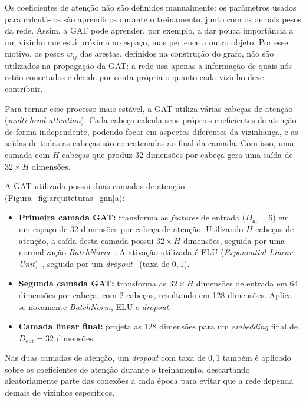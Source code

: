 Os coeficientes de atenção não são definidos manualmente: os parâmetros usados para calculá-los são aprendidos durante o treinamento, junto com os demais pesos da rede. Assim, a GAT pode aprender, por exemplo, a dar pouca importância a um vizinho que está próximo no espaço, mas pertence a outro objeto. Por esse motivo, os pesos $w_{ij}$ das arestas, definidos na construção do grafo, não são utilizados na propagação da GAT: a rede usa apenas a informação de quais nós estão conectados e decide por conta própria o quanto cada vizinho deve contribuir.

Para tornar esse processo mais estável, a GAT utiliza várias cabeças de atenção (\textit{multi-head attention}). Cada cabeça calcula seus próprios coeficientes de atenção de forma independente, podendo focar em aspectos diferentes da vizinhança, e as saídas de todas as cabeças são concatenadas ao final da camada. Com isso, uma camada com $H$ cabeças que produz 32 dimensões por cabeça gera uma saída de $32 \times H$ dimensões.

A GAT utilizada possui duas camadas de atenção (Figura~\ref{fig:arquiteturas_gnn}a):

\begin{itemize}
    \item \textbf{Primeira camada GAT:} transforma as \textit{features} de entrada ($D_{\text{in}} = 6$) em um espaço de 32 dimensões por cabeça de atenção. Utilizando $H$ cabeças de atenção, a saída desta camada possui $32 \times H$ dimensões, seguida por uma normalização \textit{BatchNorm}~\cite{ioffe2015batch}. A ativação utilizada é ELU (\textit{Exponential Linear Unit})~\cite{clevert2016fast}, seguida por um \textit{dropout}~\cite{srivastava2014dropout} (taxa de $0{,}1$). 

    \item \textbf{Segunda camada GAT:} transforma as $32 \times H$ dimensões de entrada em 64 dimensões por cabeça, com 2 cabeças, resultando em 128 dimensões. Aplica-se novamente \textit{BatchNorm}, ELU e \textit{dropout}.

    \item \textbf{Camada linear final:} projeta as 128 dimensões para um \textit{embedding} final de $D_{\text{out}} = 32$ dimensões.
\end{itemize}

Nas duas camadas de atenção, um \textit{dropout} com taxa de $0{,}1$ também é aplicado sobre os coeficientes de atenção durante o treinamento, descartando aleatoriamente parte das conexões a cada época para evitar que a rede dependa demais de vizinhos específicos.


